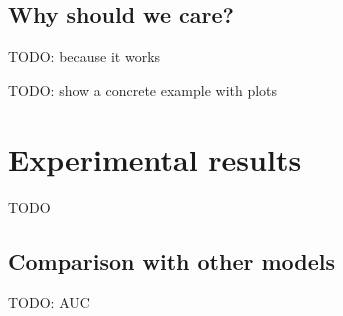 \documentclass[a4paper,11pt]{report}
\begin{document}
\section{Why should we care?}

TODO: because it works

TODO: show a concrete example with plots

\chapter{Experimental results}

TODO

\section{Comparison with other models}

TODO: AUC


\newpage



\end{document}
